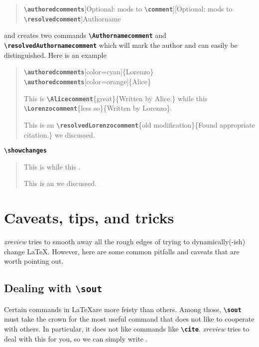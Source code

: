 \documentclass[a4paper]{ltxdoc}
\newcommand{\writecommand}[1]{\texttt{\textbf{{\textbackslash#1}}}}
\newcommand{\writearg}[1]{\{#1\}}
\begin{document}
\begin{quote}
    \writecommand{authoredcomments}[Optional: mods to \writecommand{comment}][Optional: mods to \writecommand{resolvedcomment}]{Authorname}
\end{quote}
\noindent
and creates two commands \writecommand{Authornamecomment} and \writecommand{resolvedAuthornamecomment} which will mark the author and can easily be distinguished.
Here is an example

\begin{quote}
    \writecommand{authoredcomments}[color=cyan]\writearg{Lorenzo}\newline
    \writecommand{authoredcomments}[color=orange]\writearg{Alice}\newline

    This is \writecommand{Alicecomment}\writearg{great}\writearg{Written by Alice.} while this \writecommand{Lorenzocomment}\writearg{less so}\writearg{Written by Lorenzo}.

    This is an \writecommand{resolvedLorenzocomment}\writearg{old modification}\writearg{Found appropriate citation.} we discussed.
\end{quote}

\writecommand{showchanges}
\showchanges

\begin{quote}
This is  while this .

This is an  we discussed.
\end{quote}

\section{Caveats, tips, and tricks}

\textit{xreview} tries to smooth away all the rough edges of trying to dynamically(-ish) change \LaTeX. However, here are some common pitfalls and caveats that are worth pointing out.

\subsection{Dealing with \writecommand{sout}}

Certain commands in \LaTeX are more feisty than others. Among those, \writecommand{sout} must take the crown for the most useful command that does not like to cooperate with others. In particular, it does not like commands like \writecommand{cite}.
\textit{xreview} tries to deal with this for you, so we can simply write .
\end{document}
